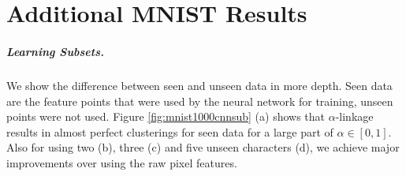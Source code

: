 \chapter{Additional MNIST Results}
\label{app:mnist}

\paragraph{Learning Subsets.} We show the difference between seen and unseen data in more depth. Seen data are the feature points that were used by the neural network for training, unseen points were not used. Figure \ref{fig:mnist1000cnnsub} (a) shows that $\alpha$-linkage results in almost perfect clusterings for seen data for a large part of $\alpha \in [0,1]$. Also for using two (b), three (c) and five unseen characters (d), we achieve major improvements over using the raw pixel features.

